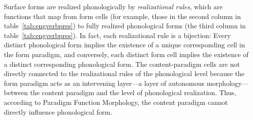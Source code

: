 Surface forms are realized phonologically by \emph{realizational rules}, which 
are functions that map from form cells (for example, those in the second column in table~\ref{tab:engverbpres})
to fully realized phonological forms (the third column in table~\ref{tab:engverbpres}). 
In fact, each realizational rule is a bijection: Every 
distinct phonological form implies the existence of a unique corresponding cell in 
the form paradigm, and conversely, each distinct form cell implies the existence of 
a distinct corresponding phonological form. The
content-paradigm cells are not directly connected to the realizational rules of 
the phonological level because the form paradigm acts as an 
intervening layer---a layer of autonomous morphology---between the 
content paradigm and the level of phonological realization. 
Thus, according to Paradigm Function Morphology, the content paradigm cannot directly influence phonological form. 

